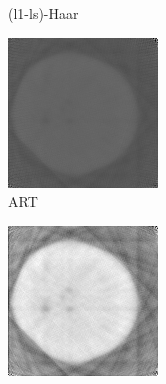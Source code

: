 \documentclass[journal]{IEEEtran}
\begin{document}
\begin{figure}[!h]
\begin{subfigure}[b]{0.24\linewidth}
        \caption{(l1-ls)-Haar}
     \end{subfigure}
    \begin{subfigure}[b]{0.24\linewidth}
        \includegraphics[width=\textwidth]{../images/potato/2D/art.png}
        \caption{ART}
     \end{subfigure}
    \begin{subfigure}[b]{0.24\linewidth}
        \includegraphics[width=\textwidth]{../images/potato/2D/sart.png}

\end{subfigure}
\end{figure}
\end{document}
